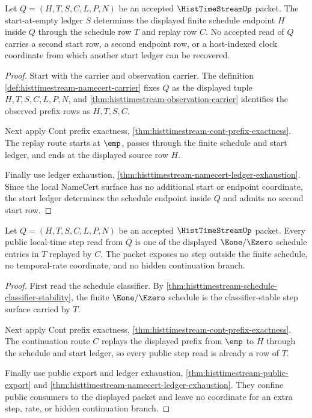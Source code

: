 \begin{theorem}
\label{thm:histtimestream-start-ledger-uniqueness}
Let $Q=(H,T,S,C,L,P,N)$ be an accepted $\HistTimeStreamUp$ packet. The start-at-empty ledger $S$ determines the displayed finite schedule endpoint $H$ inside $Q$ through the schedule row $T$ and replay row $C$. No accepted read of $Q$ carries a second start row, a second endpoint row, or a host-indexed clock coordinate from which another start ledger can be recovered.
\end{theorem}
\begin{proof}
Start with the carrier and observation carrier. The definition \autoref{def:histtimestream-namecert-carrier} fixes $Q$ as the displayed tuple $H,T,S,C,L,P,N$, and \autoref{thm:histtimestream-observation-carrier} identifies the observed prefix rows as $H,T,S,C$.

Next apply Cont prefix exactness, \autoref{thm:histtimestream-cont-prefix-exactness}. The replay route starts at $\emp$, passes through the finite schedule and start ledger, and ends at the displayed source row $H$.

Finally use ledger exhaustion, \autoref{thm:histtimestream-namecert-ledger-exhaustion}. Since the local NameCert surface has no additional start or endpoint coordinate, the start ledger determines the schedule endpoint inside $Q$ and admits no second start row.
\end{proof}

\begin{theorem}
\label{thm:histtimestream-cont-step-coverage}
Let $Q=(H,T,S,C,L,P,N)$ be an accepted $\HistTimeStreamUp$ packet. Every public local-time step read from $Q$ is one of the displayed $\Eone/\Ezero$ schedule entries in $T$ replayed by $C$. The packet exposes no step outside the finite schedule, no temporal-rate coordinate, and no hidden continuation branch.
\end{theorem}
\begin{proof}
First read the schedule classifier. By \autoref{thm:histtimestream-schedule-classifier-stability}, the finite $\Eone/\Ezero$ schedule is the classifier-stable step surface carried by $T$.

Next apply Cont prefix exactness, \autoref{thm:histtimestream-cont-prefix-exactness}. The continuation route $C$ replays the displayed prefix from $\emp$ to $H$ through the schedule and start ledger, so every public step read is already a row of $T$.

Finally use public export and ledger exhaustion, \autoref{thm:histtimestream-public-export} and \autoref{thm:histtimestream-namecert-ledger-exhaustion}. They confine public consumers to the displayed packet and leave no coordinate for an extra step, rate, or hidden continuation branch.
\end{proof}


